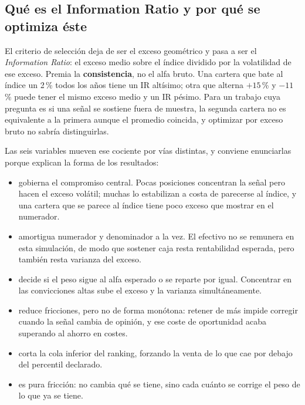 \subsection*{Qué es el Information Ratio y por qué se optimiza éste}

El criterio de selección deja de ser el exceso geométrico y pasa a ser el \emph{Information Ratio}:
el exceso medio sobre el índice dividido por la volatilidad de ese exceso. Premia la
\textbf{consistencia}, no el alfa bruto. Una cartera que bate al índice un 2\,\% todos los años
tiene un IR altísimo; otra que alterna $+15$\,\% y $-11$\,\% puede tener el mismo exceso medio y un
IR pésimo. Para un trabajo cuya pregunta es si una señal se sostiene fuera de muestra, la segunda
cartera no es equivalente a la primera aunque el promedio coincida, y optimizar por exceso bruto no
sabría distinguirlas.

Las seis variables mueven ese cociente por vías distintas, y conviene enunciarlas porque explican la
forma de los resultados:

\begin{itemize}
  \item {} gobierna el compromiso central. Pocas posiciones concentran la
  señal pero hacen el exceso volátil; muchas lo estabilizan a costa de parecerse al índice, y una
  cartera que se parece al índice tiene poco exceso que mostrar en el numerador.
  \item {} amortigua numerador y denominador a la vez. El efectivo no se
  remunera en esta simulación, de modo que sostener caja resta rentabilidad esperada, pero también
  resta varianza del exceso.
  \item {} decide si el peso sigue al alfa esperado o se reparte por igual.
  Concentrar en las convicciones altas sube el exceso y la varianza simultáneamente.
  \item {} reduce fricciones, pero no de forma monótona: retener
  de más impide corregir cuando la señal cambia de opinión, y ese coste de oportunidad acaba
  superando al ahorro en costes.
  \item {} corta la cola inferior del ranking, forzando la
  venta de lo que cae por debajo del percentil declarado.
  \item {} es pura fricción: no cambia qué se tiene, sino cada
  cuánto se corrige el peso de lo que ya se tiene.
\end{itemize}

